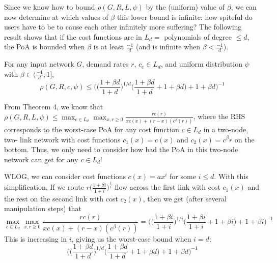 Since we know how to bound $\rho(G,R,{L},\psi)$ by the (uniform) value of $\beta$, we can now determine at which values of $\beta$ this lower bound is infinite: how spiteful do users have to be to cause each other infinitely more suffering? The following result shows that if the cost functions are in $L_d =$ polynomials of degree $\le d$, the PoA is bounded when $\beta$ is at least $\frac{-1}{d}$ (and is infinite when $\beta < \frac{-1}d$).
\begin{theorem}
For any input network $G$, demand rates $r$, $c_e \in L_d$,
and uniform distribution $\psi$ with $\beta \in (\frac{-1}{d}, 1]$,
    $$\rho(G,R,c,\psi) \le \Big(\Big(\frac{1+\beta d}{1+d}\Big)^{1/d}\Big(\frac{1+\beta d}{1+d} + 1 + \beta d\Big)+ 1 + \beta d\Big)^{-1}$$
\end{theorem}
\begin{proof-sketch}
From Theorem 4, we know that 
$\rho(G,R,{L},\psi) \le \max_{c\in{L_d}} \max_{x,r\ge 0} \frac{rc(r)}{xc(x) + (r-x)(c^\beta(r))}$, where the RHS corresponds to the worst-case PoA for any cost function $c \in L_d$ in a two-node, two-
link network with cost functions $c_1(x) = c(x)$ and $c_2(x) = c^\beta{r}$ on the bottom. 
Thus, we only need to consider how bad the PoA in this two-node network can get for any $c\in L_d$!

WLOG, we can consider cost functions $c(x) = ax^i$ for some $i \le d$. 
With this simplification,
If we route $r\Big(\frac{1+\beta i}{1+i}\Big)^{\frac{1}{i}}$ flow across the first link with cost $c_1(x)$ and the rest on the second link with cost $c_2(x)$, 
    then we get (after several manipulation steps) that 
$$\max_{c\in{L_d}} \max_{x,r\ge 0} \frac{rc(r)}{xc(x) + (r-x)(c^\beta(r))} = \Big(\Big(\frac{1+\beta i}{1+i}\Big)^{1/i}\Big(\frac{1+\beta i}{1+i} + 1 + \beta i\Big)+ 1 + \beta i\Big)^{-1}$$
    This is increasing in $i$, giving us the worst-case bound when $i=d$:
$$\Big(\Big(\frac{1+\beta d}{1+d}\Big)^{1/d}\Big(\frac{1+\beta d}{1+d} + 1 + \beta d\Big)+ 1 + \beta d\Big)^{-1}$$
\end{proof-sketch}

